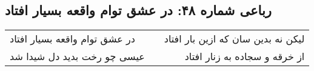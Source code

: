 \begin{center}
\section*{رباعی شماره ۴۸: در عشق توام واقعه بسیار افتاد}
\label{sec:048}
\begin{longtable}{l p{0.5cm} r}
در عشق توام واقعه بسیار افتاد
&&
لیکن نه بدین سان که ازین بار افتاد
\\
عیسی چو رخت بدید دل شیدا شد
&&
از خرقه و سجاده به زنار افتاد
\\
\end{longtable}
\end{center}
